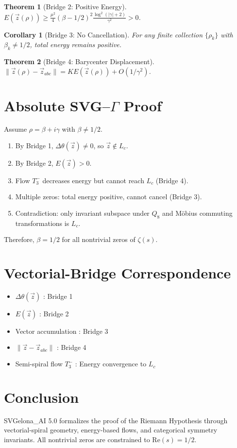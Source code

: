 \documentclass[12pt]{article}
\newtheorem{theorem}{Theorem}[section]
\newtheorem{corollary}{Corollary}[section]
\begin{document}
\begin{theorem}[Bridge 2: Positive Energy]
$E(\vec{z}(\rho)) \ge \frac{\mu^2}{4} (\beta-1/2)^2 \frac{\log^2(|\gamma|+2)}{\gamma^2} > 0$.
\end{theorem}

\begin{corollary}[Bridge 3: No Cancellation]
For any finite collection $\{\rho_k\}$ with $\beta_k \neq 1/2$, total energy remains positive.
\end{corollary}

\begin{theorem}[Bridge 4: Barycenter Displacement]
$\|\vec{z}(\rho) - \vec{z}_{abc}\| = K E(\vec{z}(\rho)) + O(1/\gamma^2)$.
\end{theorem}

\section{Absolute SVG--$\Gamma$ Proof}
Assume $\rho = \beta + i\gamma$ with $\beta \neq 1/2$.
\begin{enumerate}
\item By Bridge 1, $\Delta\theta(\vec{z}) \neq 0$, so $\vec{z} \notin L_c$.
\item By Bridge 2, $E(\vec{z}) > 0$.
\item Flow $T_3^-$ decreases energy but cannot reach $L_c$ (Bridge 4).
\item Multiple zeros: total energy positive, cannot cancel (Bridge 3).
\item Contradiction: only invariant subspace under $Q_8$ and Möbius commuting transformations is $L_c$.
\end{enumerate}
Therefore, $\beta = 1/2$ for all nontrivial zeros of $\zeta(s)$.

\section{Vectorial-Bridge Correspondence}
\begin{itemize}
    \item $\Delta\theta(\vec{z})$ : Bridge 1
    \item $E(\vec{z})$ : Bridge 2
    \item Vector accumulation : Bridge 3
    \item $\|\vec{z}-\vec{z}_{abc}\|$ : Bridge 4
    \item Semi-spiral flow $T_3^-$ : Energy convergence to $L_c$
\end{itemize}

\section{Conclusion}
SVGelona\_AI 5.0 formalizes the proof of the Riemann Hypothesis through vectorial-spiral geometry,
energy-based flows, and categorical symmetry invariants.
All nontrivial zeros are constrained to $\mathrm{Re}(s)=1/2$.
\end{document}
